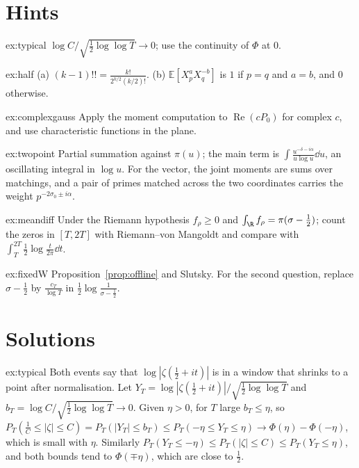 \section{Hints}

\begin{hint}{ex:typical}
$\log C/\sqrt{\frac12\log\log T}\to0$; use the continuity of $\Phi$ at $0$.
\end{hint}
\begin{hint}{ex:half}
(a) $(k-1)!!=\frac{k!}{2^{k/2}(k/2)!}$. (b) $\mathbb E[X_p^aX_q^{-b}]$ is $1$ if $p=q$ and $a=b$, and $0$ otherwise.
\end{hint}
\begin{hint}{ex:complexgauss}
Apply the moment computation to $\operatorname{Re}(cP_0)$ for complex $c$, and use characteristic functions in the plane.
\end{hint}
\begin{hint}{ex:twopoint}
Partial summation against $\pi(u)$; the main term is $\int\frac{u^{-\delta-i\alpha}}{u\log u}\dd u$, an oscillating integral in $\log u$. For the vector, the joint moments are sums over matchings, and a pair of primes matched across the two coordinates carries the weight $p^{-2\sigma_0\pm i\alpha}$.
\end{hint}
\begin{hint}{ex:meandiff}
Under the Riemann hypothesis $f_\rho\ge0$ and $\int_\R f_\rho=\pi(\sigma-\frac12)$; count the zeros in $[T,2T]$ with Riemann--von Mangoldt and compare with $\int_T^{2T}\frac12\log\frac t{2\pi}\dd t$.
\end{hint}
\begin{hint}{ex:fixedW}
Proposition~\ref{prop:offline} and Slutsky. For the second question, replace $\sigma-\frac12$ by $\frac{c_T}{\log T}$ in $\frac12\log\frac1{\sigma-\frac12}$.
\end{hint}

\section{Solutions}

\begin{solution}{ex:typical}
\idea Both events say that $\log|\zeta(\frac12+it)|$ is in a window that shrinks to a point after normalisation.
\writeup Let $Y_T=\log|\zeta(\frac12+it)|/\sqrt{\frac12\log\log T}$ and $b_T=\log C/\sqrt{\frac12\log\log T}\to0$. Given $\eta>0$, for $T$ large $b_T\le\eta$, so $P_T(\frac1C\le|\zeta|\le C)=P_T(|Y_T|\le b_T)\le P_T(-\eta\le Y_T\le\eta)\to\Phi(\eta)-\Phi(-\eta)$, which is small with $\eta$. Similarly $P_T(Y_T\le-\eta)\le P_T(|\zeta|\le C)\le P_T(Y_T\le\eta)$, and both bounds tend to $\Phi(\mp\eta)$, which are close to $\frac12$.
\end{solution}

